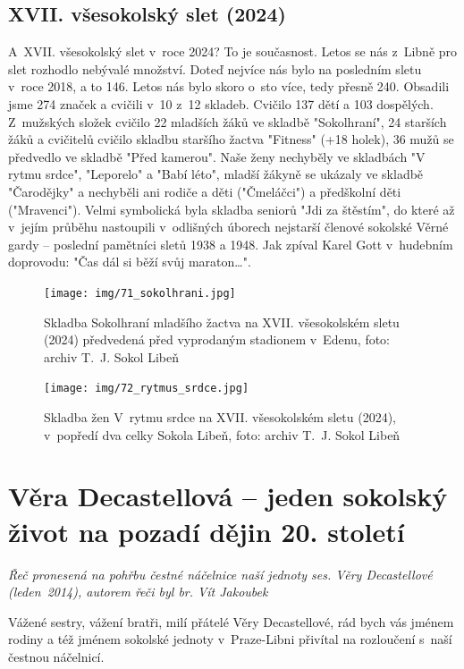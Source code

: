 \documentclass[a5paper, 11pt, twoside]{article}
\begin{document}
\subsection{XVII. všesokolský slet (2024)}
A~XVII. všesokolský slet v~roce 2024? To je současnost. Letos se nás
z~Libně pro slet rozhodlo nebývalé množství. Doteď nejvíce nás bylo na
posledním sletu v~roce 2018, a to 146. Letos nás bylo skoro o~sto více,
tedy přesně 240. Obsadili jsme 274 značek a cvičili v~10 z~12 skladeb.
Cvičilo 137 dětí a 103 dospělých. Z~mužských složek cvičilo 22 mladších
žáků ve skladbě "Sokolhraní", 24 starších žáků a cvičitelů cvičilo
skladbu staršího žactva "Fitness" (+18 holek), 36 mužů se předvedlo ve
skladbě "Před kamerou". Naše ženy nechyběly ve skladbách "V rytmu
srdce", "Leporelo" a "Babí léto", mladší žákyně se ukázaly ve
skladbě "Čarodějky" a nechyběli ani rodiče a děti ("Čmeláčci") a
předškolní děti ("Mravenci"). Velmi symbolická byla skladba seniorů
"Jdi za štěstím", do které až v~jejím průběhu nastoupili v~odlišných
úborech nejstarší členové sokolské Věrné gardy -- poslední pamětníci
sletů 1938 a 1948. Jak zpíval Karel Gott v~hudebním doprovodu: "Čas dál si běží svůj maraton\ldots".

\begin{figure}[p]
  \centering 
  \texttt{[image: img/71\_sokolhrani.jpg]}
  \caption*{Skladba Sokolhraní mladšího žactva na XVII. všesokolském sletu
  (2024) předvedená před vyprodaným stadionem v~Edenu, foto: archiv T.~J.
  Sokol Libeň}
\end{figure}

\begin{figure}[p]
  \centering 
  \texttt{[image: img/72\_rytmus\_srdce.jpg]}
  \caption*{Skladba žen V~rytmu srdce na XVII. všesokolském sletu (2024),
  v~popředí dva celky Sokola Libeň, foto: archiv T.~J. Sokol Libeň}
\end{figure}

\section{Věra Decastellová -- jeden sokolský život na pozadí dějin 20.
století}

\begin{center}
  \textit{Řeč pronesená na pohřbu čestné náčelnice naší jednoty ses. Věry
  Decastellové (leden~2014), autorem řeči byl br. Vít Jakoubek}
\end{center}

\noindent
Vážené sestry, vážení bratři, milí přátelé Věry Decastellové, rád bych
vás jménem rodiny a též jménem sokolské jednoty v~Praze-Libni přivítal
na rozloučení s~naší čestnou náčelnicí.
\end{document}
